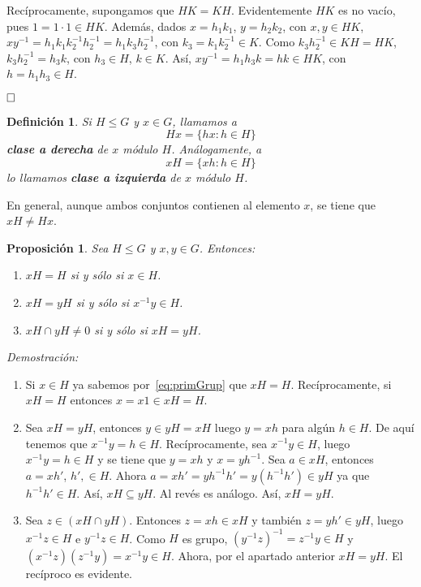 \documentclass[12pt]{article}
\newtheorem{proposition}[theorem]{Proposición}
\newtheorem{definition}[theorem]{Definición}
\begin{document}
Recíprocamente, supongamos que $HK = KH$. Evidentemente $HK$ es no vacío, pues $1 = 1 \cdot 1 \in HK$. Además, dados $x = h_{1}k_{1}$, $y = h_{2}k_{2}$, con $x,y \in HK$,$xy^{-1} = h_{1}k_{1}k_{2}^{-1}h_{2}^{-1} = h_{1}k_{3}h_{2}^{-1}$, con $k_{3} = k_{1}k_{2}^{-1} \in K$. Como $k_{3}h_{2}^{-1} \in KH = HK$, $k_{3}h_{2}^{-1} = h_{3}k$, con $h_{3} \in H$, $k \in K$. Así, $xy^{-1} = h_{1}h_{3}k = hk \in HK$, con $h = h_{1}h_{3} \in H$.

$\hfill \square$

\begin{definition}Si $H \leq G$ y $x \in G$, llamamos a $$Hx = \lbrace hx : h \in H \rbrace$$ \textbf{clase a derecha} de $x$ módulo $H$. Análogamente, a $$xH = \lbrace xh : h \in H \rbrace$$ lo llamamos \textbf{clase a izquierda} de $x$ módulo $H$. 
\end{definition}

En general, aunque ambos conjuntos contienen al elemento $x$, se tiene que $xH \neq Hx$.

\begin{proposition}\label{eq:partiGrupo} Sea $H \leq G$ y $x,y \in G$. Entonces: \begin{enumerate}
\item $xH = H$ si y sólo si $x \in H$.
\item $xH = yH$ si y sólo si $x^{-1}y \in H$.
\item $xH \cap yH \neq 0$ si y sólo si $xH = yH$.
\end{enumerate}
\end{proposition}
\emph{Demostración: }\begin{enumerate}
\item Si $x \in H$ ya sabemos por~\ref{eq:primGrup} que $xH = H$. Recíprocamente, si $xH = H$ entonces $x = x1 \in xH = H$.
\item Sea $xH = yH$, entonces $y \in yH = xH$ luego $y = xh$ para algún $h \in H$. De aquí tenemos que $x^{-1}y = h \in H$. Recíprocamente, sea $x^{-1}y \in H$, luego $x^{-1}y = h \in H$ y se tiene que $y = xh$ y $x = yh^{-1}$. Sea $a \in xH$, entonces $a = xh'$, $h' ,\in H$. Ahora $a = xh' = yh^{-1}h' = y(h^{-1}h') \in yH$ ya que $h^{-1}h' \in H$. Así, $xH \subseteq yH$. Al revés es análogo. Así, $xH = yH$.
\item Sea $z \in (xH \cap yH)$. Entonces $z = xh \in xH$ y también $z= yh' \in yH$, luego $x^{-1}z \in H$ e $y^{-1}z \in H$. Como $H$ es grupo, $(y^{-1}z)^{-1} = z^{-1}y \in H$ y $(x^{-1}z)(z^{-1}y) = x^{-1}y \in H$. Ahora, por el apartado anterior $xH = yH$. El recíproco es evidente.
\end{enumerate}
\end{document}
